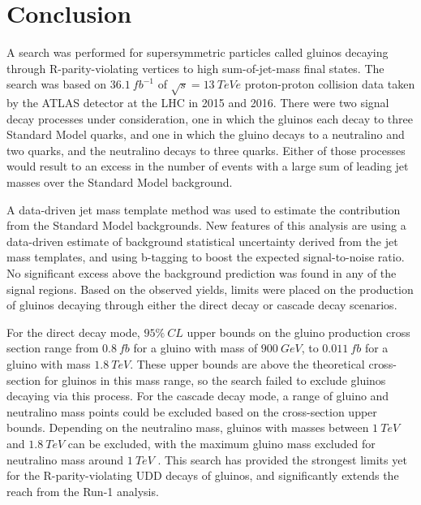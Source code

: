 \chapter{Conclusion}\label{ch:conclusion}

A search was performed for supersymmetric particles called gluinos decaying through R-parity-violating vertices to high sum-of-jet-mass final states.
The search was based on $36.1~fb^{-1}$ of $\sqrt{s}=13~TeVe$ proton-proton collision data taken by the ATLAS detector at the LHC in 2015 and 2016.
There were two signal decay processes under consideration, one in which the gluinos each decay to three Standard Model quarks, and one in which the gluino decays to a neutralino and two quarks, and the neutralino decays to three quarks.
Either of those processes would result to an excess in the number of events with a large sum of leading jet masses over the Standard Model background.

A data-driven jet mass template method was used to estimate the contribution from the Standard Model backgrounds.
New features of this analysis are using a data-driven estimate of background statistical uncertainty derived from the jet mass templates, and using b-tagging to boost the expected signal-to-noise ratio.
No significant excess above the background prediction was found in any of the signal regions.
Based on the observed yields, limits were placed on the production of gluinos decaying through either the direct decay or cascade decay scenarios.

For the direct decay mode, $95\%~CL$ upper bounds on the gluino production cross section range from $0.8~fb$ for a gluino with mass of $900~GeV$, to $0.011~fb$ for a gluino with mass $1.8~TeV$.
These upper bounds are above the theoretical cross-section for gluinos in this mass range, so the search failed to exclude gluinos decaying via this process.
For the cascade decay mode, a range of gluino and neutralino mass points could be excluded based on the cross-section upper bounds.
Depending on the neutralino mass, gluinos with masses between $1~TeV$ and $1.8~TeV$ can be excluded, with the maximum gluino mass excluded for neutralino mass around $1~TeV$ .
This search has provided the strongest limits yet for the R-parity-violating UDD decays of gluinos, and significantly extends the reach from the Run-1 analysis.
